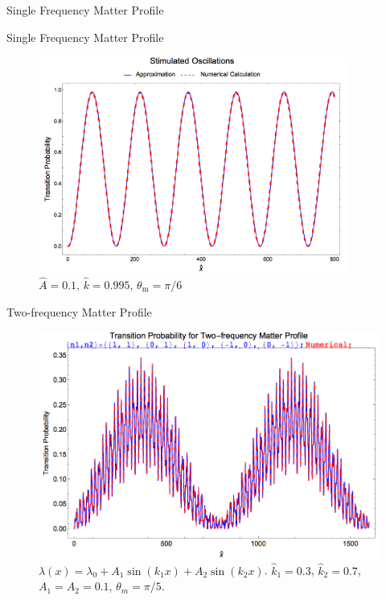 \documentclass[9pt]{beamer}
\begin{document}
\begin{darkframes}
\begin{frame}{Single Frequency Matter Profile}
\end{frame}


\begin{frame}{Single Frequency Matter Profile}

\begin{figure}
    \centering
    \includegraphics[width=0.9\textwidth]{assets/stimulated-oscillation-rwa-and-numerical.png}
    \caption*{$\hat A=0.1$, $\hat k=0.995$, $\theta_{\mathrm{m}}=\pi/6$}
\end{figure}

\end{frame}







\begin{frame}{Two-frequency Matter Profile}


\begin{figure}
    \centering
    \includegraphics[width=\textwidth]{assets/2-freq-numerical-and-first-5-rwa.png}
    \caption*{$\lambda(x) = \lambda_0 + A_1\sin(k_1 x) + A_2\sin(k_2 x)$. $\hat k_1=0.3$, $\hat k_2=0.7$, $A_1=A_2=0.1$, $\theta_m=\pi/5$.}
\end{figure}



\end{frame}
\end{darkframes}
\end{document}
